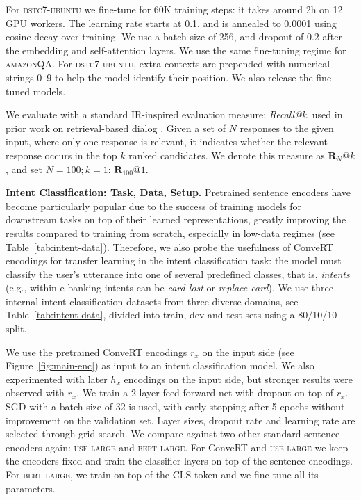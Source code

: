 \documentclass[11pt,a4paper]{article}
\begin{document}
For \textsc{dstc7-ubuntu} we fine-tune for 60K training steps: it takes around 2h on 12 GPU workers. The learning rate starts at 0.1, and is annealed to 0.0001 using cosine decay over training. We use a batch size of 256, and dropout of 0.2 after the embedding and self-attention layers. We use the same fine-tuning regime for \textsc{amazonQA}. For \textsc{dstc7-ubuntu}, extra contexts are prepended with numerical strings 0--9 to help the model identify their position. We also release the fine-tuned models. 

We evaluate with a standard IR-inspired evaluation measure: \textit{Recall@k}, used in prior work on retrieval-based dialog \cite{Chaudhuri:2018conll,Henderson:2019acl,Gunasekara:2019dstc7}. Given a set of $N$ responses to the given input, where only one response is relevant, it indicates whether the relevant response occurs in the top $k$ ranked candidates. We denote this measure as $\mathbf{R}_{N}@k$, and set $N=100; k=1$: $\mathbf{R}_{100}@1$. 



\vspace{1.3mm}
\noindent \textbf{Intent Classification: Task, Data, Setup.} 
Pretrained sentence encoders have become particularly popular due to the success of training models
for downstream tasks on top of their learned representations, greatly improving the results compared
to training from scratch, especially in low-data regimes (see Table~\ref{tab:intent-data}). Therefore, we also probe the usefulness of ConveRT encodings for transfer learning in the intent classification task: the model must classify the user's utterance into one of several predefined classes, that is, \textit{intents} (e.g., within e-banking intents can be \textit{card lost} or \textit{replace card}). We use three internal intent classification datasets from three diverse domains, see Table~\ref{tab:intent-data}, divided into train, dev and test sets using a 80/10/10 split.

We use the pretrained ConveRT encodings $r_x$ on the input side (see Figure~\ref{fig:main-enc}) as input to an intent classification model. We also experimented with later $h_x$ encodings on the input side, but stronger results were observed with $r_x$. We train a 2-layer feed-forward net with dropout on top of $r_x$. SGD with a batch size of 32 is used, with early stopping after 5 epochs without improvement on the validation set. Layer sizes, dropout rate and learning rate are selected through grid search. We compare against two other standard sentence encoders again: \textsc{use-large} and \textsc{bert-large}. For ConveRT and \textsc{use-large} we keep the encoders fixed and train the classifier layers on top of the sentence encodings. For \textsc{bert-large}, we train on top of the \textsc{CLS} token and we fine-tune all its parameters.
\end{document}
